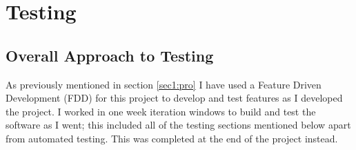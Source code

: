 \chapter{Testing}







\section{Overall Approach to Testing}
As previously mentioned in section \ref{sec1:pro} I have used a Feature Driven Development (FDD) for this project to develop and test features as I developed the project. I worked in one week iteration windows to build and test the software as I went; this included all of the testing sections mentioned below apart from automated testing. This was completed at the end of the project instead.




